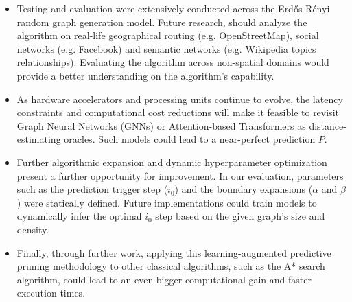 \begin{itemize}
    \item Testing and evaluation were extensively conducted across the Erdős-Rényi random graph generation model. Future research, should analyze the algorithm on real-life geographical routing (e.g. OpenStreetMap), social networks (e.g. Facebook) and semantic networks (e.g. Wikipedia topics relationships). Evaluating the algorithm across non-spatial domains would provide a better understanding on the algorithm's capability.
    \item As hardware accelerators and processing units continue to evolve, the latency constraints and computational cost reductions will make it feasible to revisit Graph Neural Networks (GNNs) or Attention-based Transformers as distance-estimating oracles. Such models could lead to a near-perfect prediction $P$.
    \item Further algorithmic expansion and dynamic hyperparameter optimization present a further opportunity for improvement. In our evaluation, parameters such as the prediction trigger step ($i_0$) and the boundary expansions ($\alpha$ and $\beta$) were statically defined. Future implementations could train models to dynamically infer the optimal $i_0$ step based on the given graph's size and density. 
    \item Finally, through further work, applying this learning-augmented predictive pruning methodology to other classical algorithms, such as the A* search algorithm, could lead to an even bigger computational gain and faster execution times.
\end{itemize}
